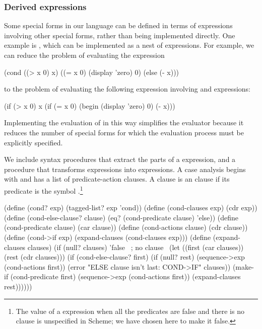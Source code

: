\subsubsection*{Derived expressions}

Some special forms in our language can be defined in terms of expressions
involving other special forms, rather than being implemented directly.  One
example is , which can be implemented as a nest of 
expressions.  For example, we can reduce the problem of evaluating the
expression

\begin{codeBlock}
(cond ((> x 0) x)
      ((= x 0) (display 'zero) 0)
      (else (- x)))
\end{codeBlock}

\noindent
to the problem of evaluating the following expression involving  and
 expressions:

\begin{codeBlock}
(if (> x 0)
    x
    (if (= x 0)
        (begin (display 'zero) 0)
        (- x)))
\end{codeBlock}

\noindent
Implementing the evaluation of  in this way simplifies the evaluator
because it reduces the number of special forms for which the evaluation process
must be explicitly specified.

We include syntax procedures that extract the parts of a 
expression, and a procedure  that transforms 
expressions into  expressions.  A case analysis begins with
 and has a list of predicate-action clauses.  A clause is an
 clause if its predicate is the symbol .\footnote{The
value of a  expression when all the predicates are false and there
is no  clause is unspecified in Scheme; we have chosen here to make
it false.}

\begin{codeBlock}
(define (cond? exp) (tagged-list? exp 'cond))
(define (cond-clauses exp) (cdr exp))
(define (cond-else-clause? clause)
  (eq? (cond-predicate clause) 'else))
(define (cond-predicate clause) (car clause))
(define (cond-actions clause) (cdr clause))
(define (cond->if exp) (expand-clauses (cond-clauses exp)))
(define (expand-clauses clauses)
  (if (null? clauses)
      'false                        ~\textrm{; no  clause}~
      (let ((first (car clauses))
            (rest (cdr clauses)))
        (if (cond-else-clause? first)
            (if (null? rest)
                (sequence->exp (cond-actions first))
                (error
                  "ELSE clause isn't last: COND->IF"
                  clauses))
            (make-if (cond-predicate first)
                     (sequence->exp
                       (cond-actions first))
                     (expand-clauses rest))))))
\end{codeBlock}

